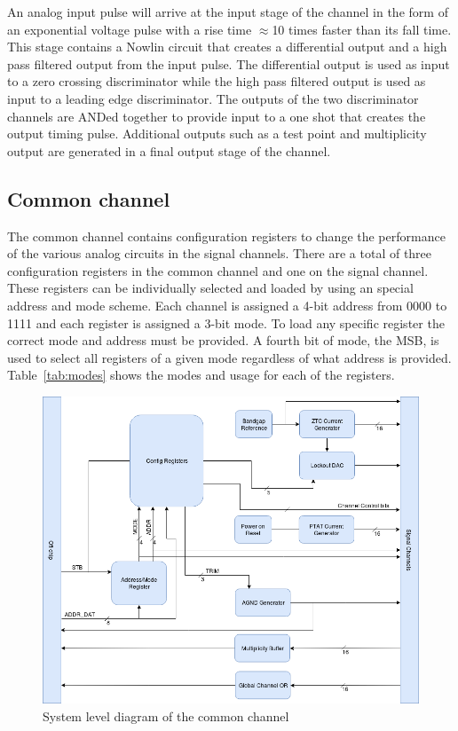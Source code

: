 \documentclass[12pt,oneside,final]{siuethesis}
\theoremstyle{definition}
\begin{document}
\par An analog input pulse will arrive at the input stage of the channel in the form of an exponential voltage pulse with a rise time $\approx$10 times faster than its fall time. This stage contains a Nowlin circuit that creates a differential output and a high pass filtered output from the input pulse. The differential output is used as input to a zero crossing discriminator while the high pass filtered output is used as input to a leading edge discriminator. The outputs of the two discriminator channels are ANDed together to provide input to a one shot that creates the output timing pulse. Additional outputs such as a test point and multiplicity output are generated in a final output stage of the channel. 

\subsection{Common channel}
\par The common channel contains configuration registers to change the performance of the various analog circuits in the signal channels. There are a total of three configuration registers in the common channel and one on the signal channel. These registers can be individually selected and loaded by using an special address and mode scheme. Each channel is assigned a 4-bit address from 0000 to 1111 and each register is assigned a 3-bit mode. To load any specific register the correct mode and address must be provided. A fourth bit of mode, the MSB, is used to select all registers of a given mode regardless of what address is provided. Table~\ref{tab:modes} shows the modes and usage for each of the registers.

\begin{figure}[htbp!]
\centering
\includegraphics[scale=.5,keepaspectratio=true]{./ch2_figures/common_block.png} 
\caption{System level diagram of the common channel}
\label{fig:common-block}
\end{figure}
\end{document}
